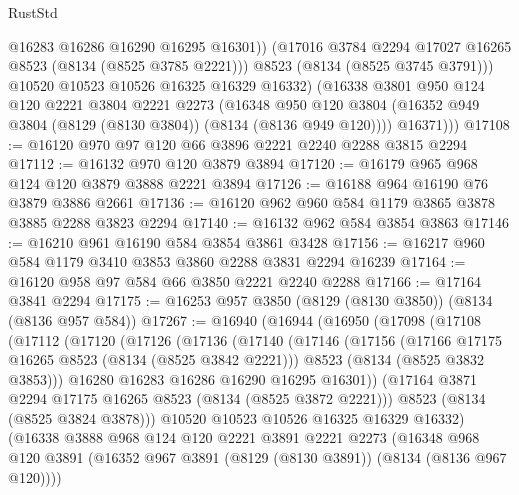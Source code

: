 \begin{lexlean}{RustStd}
\begin{coremodule}
                @16283
                @16286
                @16290
                @16295
                @16301))
            (@17016 @3784 @2294 @17027 @16265 @8523 (@8134 (@8525 @3785 @2221)))
            @8523
            (@8134 (@8525 @3745 @3791)))
          @10520
          @10523
          @10526
          @16325
          @16329
          @16332)
        (@16338
          @3801
          @950
          @124
          @120
          @2221
          @3804
          @2221
          @2273
          (@16348
            @950
            @120
            @3804
            (@16352 @949 @3804 (@8129 (@8130 @3804)) (@8134 (@8136 @949 @120))))
          @16371)))
@17108 := @16120 @970 @97 @120 @66 @3896 @2221 @2240 @2288 @3815 @2294
@17112 := @16132 @970 @120 @3879 @3894
@17120 := @16179 @965 @968 @124 @120 @3879 @3888 @2221 @3894
@17126 := @16188 @964 @16190 @76 @3879 @3886 @2661
@17136 := @16120 @962 @960 @584 @1179 @3865 @3878 @3885 @2288 @3823 @2294
@17140 := @16132 @962 @584 @3854 @3863
@17146 := @16210 @961 @16190 @584 @3854 @3861 @3428
@17156 := @16217 @960 @584 @1179 @3410 @3853 @3860 @2288 @3831 @2294 @16239
@17164 := @16120 @958 @97 @584 @66 @3850 @2221 @2240 @2288
@17166 := @17164 @3841 @2294
@17175 := @16253 @957 @3850 (@8129 (@8130 @3850)) (@8134 (@8136 @957 @584))
@17267 := @16940
    (@16944
      (@16950
        (@17098
          (@17108
            (@17112
              (@17120
                (@17126
                  (@17136
                    (@17140
                      (@17146
                        (@17156
                          (@17166 @17175 @16265 @8523 (@8134 (@8525 @3842 @2221)))
                          @8523
                          (@8134 (@8525 @3832 @3853)))
                        @16280
                        @16283
                        @16286
                        @16290
                        @16295
                        @16301))
                    (@17164 @3871 @2294 @17175 @16265 @8523 (@8134 (@8525 @3872 @2221)))
                    @8523
                    (@8134 (@8525 @3824 @3878)))
                  @10520
                  @10523
                  @10526
                  @16325
                  @16329
                  @16332)
                (@16338
                  @3888
                  @968
                  @124
                  @120
                  @2221
                  @3891
                  @2221
                  @2273
                  (@16348
                    @968
                    @120
                    @3891
                    (@16352 @967 @3891 (@8129 (@8130 @3891)) (@8134 (@8136 @967 @120))))

\end{coremodule}
\end{lexlean}
